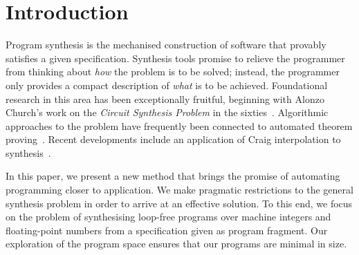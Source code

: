 \algrenewcommand{}
\algrenewcommand{}


\newcommand*\Let[2]{\State #1 $\gets$ #2}

\newcommand{\bv}[2]{\mathcal{BV}(#1, #2)}

\makeatletter
{}
\makeatother


\iffalse
\section{Introduction}

Program synthesis is the mechanised construction of software that provably
satisfies a given specification.  Synthesis tools promise to relieve the
programmer from thinking about \emph{how} the problem is to be solved;
instead, the programmer only provides a compact description of \emph{what}
is to be achieved.  Foundational research in this area has been
exceptionally fruitful, beginning with Alonzo Church's work on the
\emph{Circuit Synthesis Problem} in the sixties~\cite{church-synth}.
Algorithmic approaches to the problem have frequently been connected to
automated theorem proving~\cite{manna-waldinger,proof-planning}.
Recent developments include an application of Craig interpolation
to synthesis~\cite{synth-interpolants}.

In this paper, we present a new method that brings the promise of
automating programming closer to application.  We make pragmatic
restrictions to the general synthesis problem in order to arrive at an
effective solution.  To this end, we focus on the problem of synthesising
loop-free programs over machine integers and floating-point numbers from a
specification given as program fragment.  Our exploration of the program
space ensures that our programs are minimal in size.

